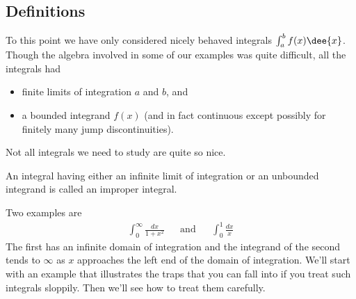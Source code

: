 \subsection{Definitions}
To this point we have only considered nicely behaved integrals $\int_a^b f(x)\dee{x}$.
Though the algebra involved in some of our examples was quite difficult, all the
integrals had
\begin{itemize}
\item finite limits of integration $a$ and $b$, and
\item a bounded integrand $f(x)$ (and in fact continuous except
possibly for finitely many jump discontinuities).
\end{itemize}
Not all integrals we need to study are quite so nice.
\begin{defn}
 An integral having either an infinite limit of integration or an unbounded
integrand is called an improper integral.
\end{defn}
Two examples are
\begin{align*}
\int_0^\infty\frac{dx}{1+x^2}&& \text{and}&&
\int_0^1\frac{dx}{x}
\end{align*}
The first has an infinite domain of integration and the integrand of the
second tends to $\infty$ as $x$ approaches the left end of the domain of
integration. We'll start with an example that illustrates the traps
that you can fall into if you treat such integrals sloppily. Then we'll
see how to treat them carefully.

